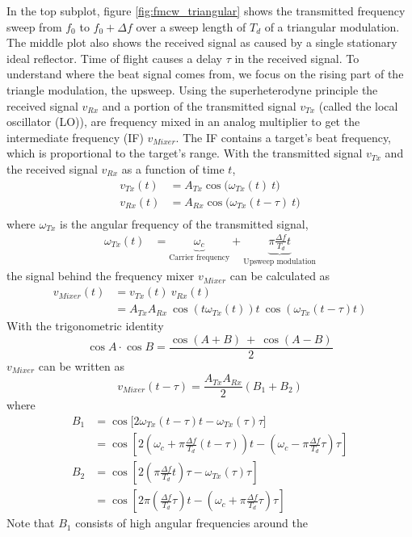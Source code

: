 In the top subplot, figure \ref{fig:fmcw_triangular} shows the transmitted frequency sweep
from \(f_0\) to \(f_0 + \Delta f\) over a sweep length of \(T_d\) of a
triangular modulation. The middle plot also shows the received signal as
caused by a single stationary ideal reflector. Time of flight causes a
delay \(\tau\) in the received signal. To understand where the beat
signal comes from, we focus on the rising part of the triangle
modulation, the upsweep. Using the superheterodyne principle the
received signal \(v_{Rx}\) and a portion of the transmitted signal
\(v_{Tx}\) (called the local oscillator (LO)), are frequency mixed in an
analog multiplier to get the intermediate frequency (IF) \(v_{Mixer}\).
The IF contains a target's beat frequency, which is proportional to the
target's range. With the transmitted signal \(v_{Tx}\) and the received
signal \(v_{Rx}\) as a function of time \(t\), \[
\begin{aligned}
v_{Tx}(t) &= A_{Tx} \cos\bigl(\omega_{Tx}(t)~t\bigr)\\
v_{Rx}(t) &= A_{Rx} \cos\bigl(\omega_{Tx}(t-\tau)~t\bigr)\\
\end{aligned}
\] where \(\omega_{Tx}\) is the angular frequency of the transmitted
signal, \[
\begin{aligned}
\omega_{Tx}(t) &= \underbrace{\omega_c}_\text{Carrier frequency} + \underbrace{\pi \frac{\Delta f}{T_d} t}_\text{Upsweep modulation}
\end{aligned}
\] the signal behind the frequency mixer \(v_{Mixer}\) can be calculated
as \[
\begin{aligned}
v_{Mixer}(t) &= v_{Tx}(t) ~ v_{Rx}(t) \\
&= A_{Tx}A_{Rx}~\cos(t\omega_{Tx}(t))t~\cos(\omega_{Tx}(t-\tau)t)
\end{aligned}
\] With the trigonometric identity
\[ \cos A \cdot \cos B = \frac{ \cos(A+B)~+~\cos(A-B) }{2} \]
\(v_{Mixer}\) can be written as \[
v_{Mixer}(t-\tau) = \frac{A_{Tx} A_{Rx}}{2}(B_1 + B_2)
\] where \[
\begin{aligned}
B_1 &= \cos\bigl[ 2\omega_{Tx}(t-\tau) t - \omega_{Tx}(\tau)\tau \bigr]\\
    &= \cos\left[ 2\left(\omega_c + \pi\frac{\Delta f}{T_d}(t-\tau)\right)t - \left(\omega_c - \pi\frac{\Delta f}{T_d}\tau\right)\tau \right]\\
B_2 &= \cos\left[ 2\left(\pi\frac{\Delta f}{T_d}t\right)\tau - \omega_{Tx}(\tau)\tau \right]\\
    &= \cos\left[ 2\pi\left(\frac{\Delta f}{T_d}\tau\right)t - \left(\omega_c + \pi\frac{\Delta f}{T_d}\tau\right)\tau \right]
\end{aligned}
\] Note that \(B_1\) consists of high angular frequencies around the
